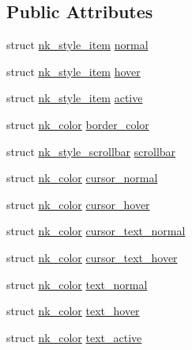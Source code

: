 \subsection*{Public Attributes}
\begin{DoxyCompactItemize}
\item 
struct \mbox{\hyperlink{structnk__style__item}{nk\+\_\+style\+\_\+item}} \mbox{\hyperlink{structnk__style__edit_ad07a13b0c2bb0fca11d9c0f5e940affd}{normal}}
\item 
struct \mbox{\hyperlink{structnk__style__item}{nk\+\_\+style\+\_\+item}} \mbox{\hyperlink{structnk__style__edit_aeba75ada6a93ea4e9134d4b0267180c9}{hover}}
\item 
struct \mbox{\hyperlink{structnk__style__item}{nk\+\_\+style\+\_\+item}} \mbox{\hyperlink{structnk__style__edit_a084d5d9e1dd1e1c96842b38f9374b5f5}{active}}
\item 
struct \mbox{\hyperlink{structnk__color}{nk\+\_\+color}} \mbox{\hyperlink{structnk__style__edit_a7db1be8d08fe0819c01573f30fd76dc4}{border\+\_\+color}}
\item 
struct \mbox{\hyperlink{structnk__style__scrollbar}{nk\+\_\+style\+\_\+scrollbar}} \mbox{\hyperlink{structnk__style__edit_a6e07fcf853df1fa96f9ccdd2f09621fe}{scrollbar}}
\item 
struct \mbox{\hyperlink{structnk__color}{nk\+\_\+color}} \mbox{\hyperlink{structnk__style__edit_a5836e5f5889e3cfb9ceeb95d1e870b0b}{cursor\+\_\+normal}}
\item 
struct \mbox{\hyperlink{structnk__color}{nk\+\_\+color}} \mbox{\hyperlink{structnk__style__edit_aa204d0ab634e2a3d1c36497a847fbb0e}{cursor\+\_\+hover}}
\item 
struct \mbox{\hyperlink{structnk__color}{nk\+\_\+color}} \mbox{\hyperlink{structnk__style__edit_a8026344f1ad30782ef0972230e68e717}{cursor\+\_\+text\+\_\+normal}}
\item 
struct \mbox{\hyperlink{structnk__color}{nk\+\_\+color}} \mbox{\hyperlink{structnk__style__edit_ad68a82d55489c7748b329f9c051144f8}{cursor\+\_\+text\+\_\+hover}}
\item 
struct \mbox{\hyperlink{structnk__color}{nk\+\_\+color}} \mbox{\hyperlink{structnk__style__edit_acad2fea48a0bd07cf6a21a30292ee3ff}{text\+\_\+normal}}
\item 
struct \mbox{\hyperlink{structnk__color}{nk\+\_\+color}} \mbox{\hyperlink{structnk__style__edit_a7af161d85dc3942b7f28e8ef127d0209}{text\+\_\+hover}}
\item 
struct \mbox{\hyperlink{structnk__color}{nk\+\_\+color}} \mbox{\hyperlink{structnk__style__edit_ac9f510ee90c741d734319c11ef0c91c0}{text\+\_\+active}}

\end{DoxyCompactItemize}
